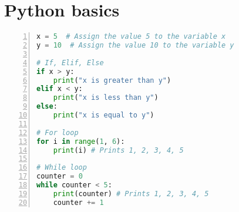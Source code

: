 \chapter{Python basics}

\begin{lstlisting}[language=Python, numbers=left]
x = 5  # Assign the value 5 to the variable x
y = 10  # Assign the value 10 to the variable y

# If, Elif, Else
if x > y:
    print("x is greater than y")
elif x < y:
    print("x is less than y")
else:
    print("x is equal to y")

# For loop
for i in range(1, 6):
    print(i) # Prints 1, 2, 3, 4, 5

# While loop
counter = 0
while counter < 5:
    print(counter) # Prints 1, 2, 3, 4, 5
    counter += 1
\end{lstlisting}
